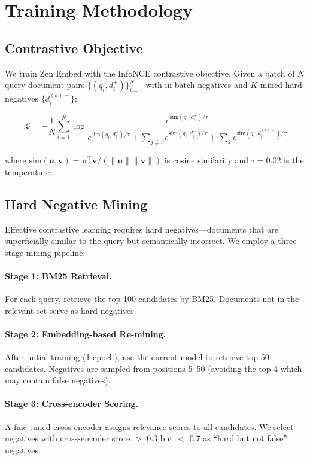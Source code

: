 \documentclass[11pt,a4paper]{article}
\begin{document}
\section{Training Methodology}

\subsection{Contrastive Objective}

We train Zen Embed with the InfoNCE contrastive objective. Given a batch of $N$ query-document pairs $\{(q_i, d_i^+)\}_{i=1}^N$ with in-batch negatives and $K$ mined hard negatives $\{d_i^{(k)-}\}$:

\begin{equation}
\mathcal{L} = -\frac{1}{N} \sum_{i=1}^{N} \log \frac{e^{\text{sim}(q_i, d_i^+)/\tau}}{e^{\text{sim}(q_i, d_i^+)/\tau} + \sum_{j \neq i} e^{\text{sim}(q_i, d_j^+)/\tau} + \sum_k e^{\text{sim}(q_i, d_i^{(k)-})/\tau}}
\end{equation}

where $\text{sim}(\mathbf{u}, \mathbf{v}) = \mathbf{u}^\top \mathbf{v} / (\|\mathbf{u}\| \|\mathbf{v}\|)$ is cosine similarity and $\tau = 0.02$ is the temperature.

\subsection{Hard Negative Mining}

Effective contrastive learning requires hard negatives—documents that are superficially similar to the query but semantically incorrect. We employ a three-stage mining pipeline:

\paragraph{Stage 1: BM25 Retrieval.} For each query, retrieve the top-100 candidates by BM25. Documents not in the relevant set serve as hard negatives.

\paragraph{Stage 2: Embedding-based Re-mining.} After initial training (1 epoch), use the current model to retrieve top-50 candidates. Negatives are sampled from positions 5--50 (avoiding the top-4 which may contain false negatives).

\paragraph{Stage 3: Cross-encoder Scoring.} A fine-tuned cross-encoder assigns relevance scores to all candidates. We select negatives with cross-encoder score $>$ 0.3 but $<$ 0.7 as ``hard but not false'' negatives.
\end{document}
